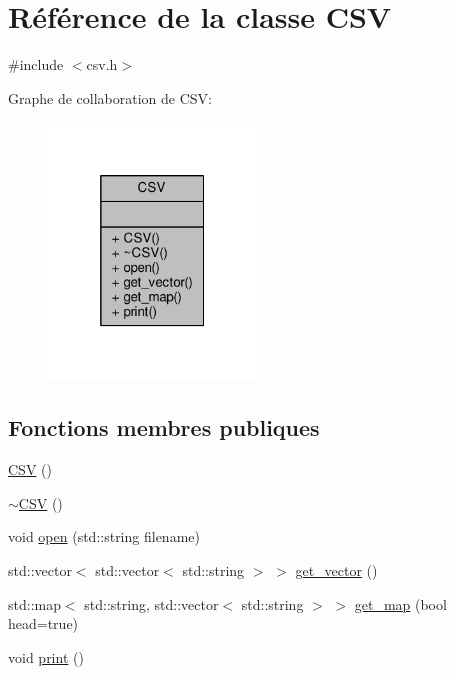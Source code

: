\hypertarget{classCSV}{}\section{Référence de la classe C\+SV}
\label{classCSV}


{\ttfamily \#include $<$csv.\+h$>$}



Graphe de collaboration de C\+SV\+:
\nopagebreak
\begin{figure}[H]
\begin{center}
\leavevmode
\includegraphics[width=157pt]{classCSV__coll__graph}
\end{center}
\end{figure}
\subsection*{Fonctions membres publiques}
\begin{DoxyCompactItemize}
\item 
\hyperlink{classCSV_a335bef6309d648d44907c0e7279cc32c}{C\+SV} ()
\item 
\hyperlink{classCSV_ae1b0cfd98d62cf81004462320848c665}{$\sim$\+C\+SV} ()
\item 
void \hyperlink{classCSV_a80fbeab0aad2b0695d0720cc863826b8}{open} (std\+::string filename)
\item 
std\+::vector$<$ std\+::vector$<$ std\+::string $>$ $>$ \hyperlink{classCSV_a62f788e022970a4e847a8850efa9d75a}{get\+\_\+vector} ()
\item 
std\+::map$<$ std\+::string, std\+::vector$<$ std\+::string $>$ $>$ \hyperlink{classCSV_af29150140f6e2ad4a75928fbb1ff23a7}{get\+\_\+map} (bool head=true)
\item 
void \hyperlink{classCSV_aabdbae3a626d0bc5a0dc573c9161f0a9}{print} ()
\end{DoxyCompactItemize}


